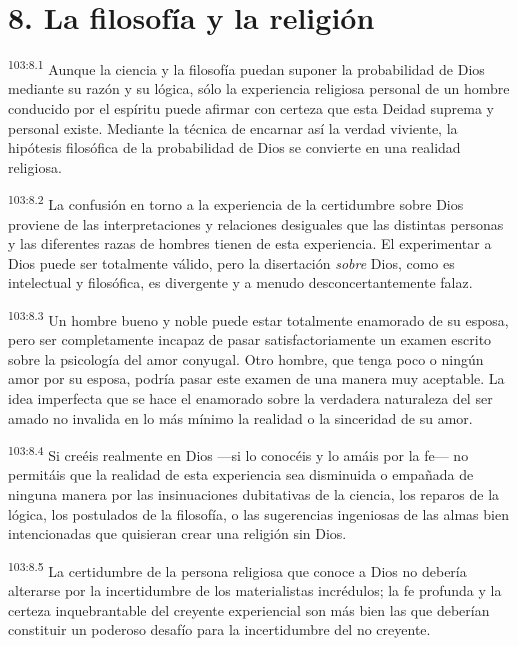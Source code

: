 \documentclass[twoside, 11pt]{book}
\begin{document}
\section*{8. La filosofía y la religión}
\par
\textsuperscript{103:8.1} Aunque la ciencia y la filosofía puedan suponer la probabilidad de Dios mediante su razón y su lógica, sólo la experiencia religiosa personal de un hombre conducido por el espíritu puede afirmar con certeza que esta Deidad suprema y personal existe. Mediante la técnica de encarnar así la verdad viviente, la hipótesis filosófica de la probabilidad de Dios se convierte en una realidad religiosa.

\par
\textsuperscript{103:8.2} La confusión en torno a la experiencia de la certidumbre sobre Dios proviene de las interpretaciones y relaciones desiguales que las distintas personas y las diferentes razas de hombres tienen de esta experiencia. El experimentar a Dios puede ser totalmente válido, pero la disertación \textit{sobre} Dios, como es intelectual y filosófica, es divergente y a menudo desconcertantemente falaz.

\par
\textsuperscript{103:8.3} Un hombre bueno y noble puede estar totalmente enamorado de su esposa, pero ser completamente incapaz de pasar satisfactoriamente un examen escrito sobre la psicología del amor conyugal. Otro hombre, que tenga poco o ningún amor por su esposa, podría pasar este examen de una manera muy aceptable. La idea imperfecta que se hace el enamorado sobre la verdadera naturaleza del ser amado no invalida en lo más mínimo la realidad o la sinceridad de su amor.

\par
\textsuperscript{103:8.4} Si creéis realmente en Dios ---si lo conocéis y lo amáis por la fe--- no permitáis que la realidad de esta experiencia sea disminuida o empañada de ninguna manera por las insinuaciones dubitativas de la ciencia, los reparos de la lógica, los postulados de la filosofía, o las sugerencias ingeniosas de las almas bien intencionadas que quisieran crear una religión sin Dios.

\par
\textsuperscript{103:8.5} La certidumbre de la persona religiosa que conoce a Dios no debería alterarse por la incertidumbre de los materialistas incrédulos; la fe profunda y la certeza inquebrantable del creyente experiencial son más bien las que deberían constituir un poderoso desafío para la incertidumbre del no creyente.
\end{document}
